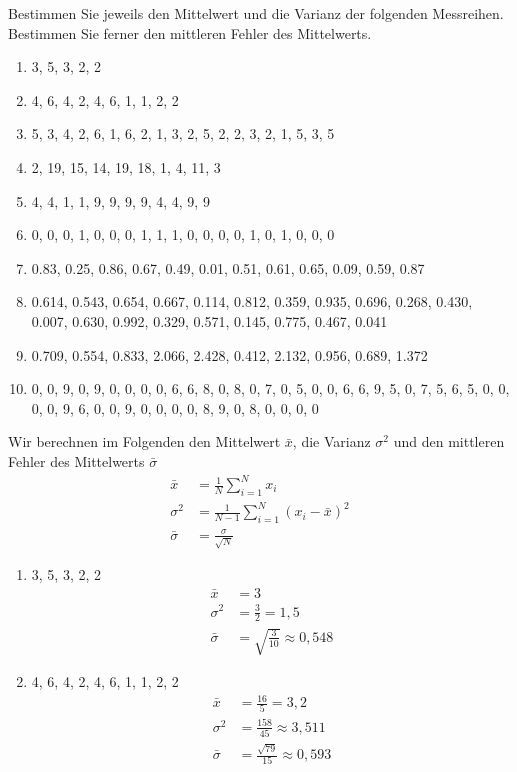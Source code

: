 \documentclass[11pt,answers]{exam}
\begin{document}
\begin{questions}
Bestimmen Sie jeweils den Mittelwert und die Varianz der folgenden Messreihen.
Bestimmen Sie ferner den mittleren Fehler des Mittelwerts.
\begin{enumerate}
\item {3, 5, 3, 2, 2}
\item {4, 6, 4, 2, 4, 6, 1, 1, 2, 2}
\item {5, 3, 4, 2, 6, 1, 6, 2, 1, 3, 2, 5, 2, 2, 3, 2, 1, 5, 3, 5}
\item {2, 19, 15, 14, 19, 18, 1, 4, 11, 3}
\item {4, 4, 1, 1, 9, 9, 9, 9, 4, 4, 9, 9}
\item {0, 0, 0, 1, 0, 0, 0, 1, 1, 1, 0, 0, 0, 0, 1, 0, 1, 0, 0, 0}
\item {0.83, 0.25, 0.86, 0.67, 0.49, 0.01, 0.51, 0.61, 0.65, 0.09, 0.59, 0.87}
\item {0.614, 0.543, 0.654, 0.667, 0.114, 0.812, 
        0.359, 0.935, 0.696, 0.268, 0.430, 0.007, 0.630, 
        0.992, 0.329, 0.571, 0.145, 0.775, 0.467, 0.041}
\item {0.709, 0.554, 0.833, 2.066, 2.428, 0.412, 2.132, 0.956, 0.689, 1.372}
\item {0, 0, 9, 0, 9, 0, 0, 0, 0, 6, 6, 8, 0, 8, 0, 7, 0, 5, 0, 0, 6, 6, 9,
5, 0, 7, 5, 6, 5, 0, 0, 0, 0, 9, 6, 0, 0, 9, 0, 0, 0, 0, 8, 9, 0, 8,
0, 0, 0, 0} 
\end{enumerate}
\begin{solution}Wir berechnen im Folgenden den Mittelwert $\bar x$, die 
Varianz $\sigma^2$ und den mittleren Fehler des Mittelwerts $\bar \sigma$
\begin{align*}
\bar{x}&=\frac{1}{N}\sum_{i=1}^Nx_i
\\
\sigma^2&=\frac{1}{N-1}\sum_{i=1}^N(x_i-\bar x)^2
\\
\bar \sigma&=\frac{\sigma}{\sqrt{N}}
\end{align*}
\begin{enumerate}

\item {3, 5, 3, 2, 2}
\begin{align*}
\bar x&=3
\\
\sigma^2&=\frac{3}{2}=1,5
\\
\bar \sigma&=\sqrt{\frac{3}{10}}\approx 0,548
\end{align*}

\item {4, 6, 4, 2, 4, 6, 1, 1, 2, 2}
\begin{align*}
\bar x&=\frac{16}{5}=3,2
\\
\sigma^2&=\frac{158}{45}\approx 3,511
\\
\bar \sigma&=\frac{\sqrt{79}}{15}\approx 0,593
\end{align*}


\end{enumerate}
\end{solution}
\end{questions}
\end{document}
